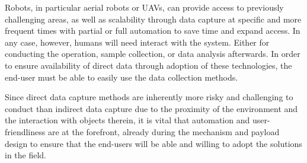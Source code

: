 


Robots, in particular aerial robots or UAVs, can provide access to previously challenging areas, as well as scalability through data capture at specific and more frequent times with partial or full automation to save time and expand access. In any case, however, humans will need interact with the system. Either for conducting the operation, sample collection, or data analysis afterwards. In order to ensure availability of direct data through adoption of these technologies, the end-user must be able to easily use the data collection methods.


Since direct data capture methods are inherently more risky and challenging to conduct than indirect data capture due to the proximity of the environment and the interaction with objects therein, it is vital that automation and user-friendliness are at the forefront, already during the mechanism and payload design to ensure that the end-users will be able and willing to adopt the solutions in the field.


